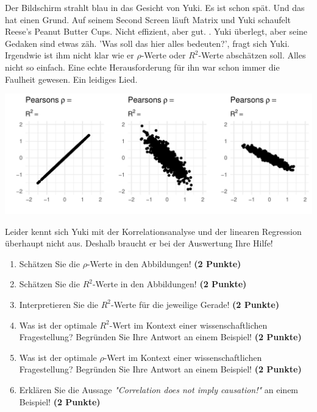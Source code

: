 \documentclass[a4paper, 9pt]{scrartcl}\usepackage[]{graphicx}\usepackage[]{xcolor}
\makeatletter
\def\maxwidth{ %
  \ifdim\Gin@nat@width>\linewidth
    \linewidth
  \else
    \Gin@nat@width
  \fi
}
\makeatother
\begin{document}
Der Bildschirm strahlt blau in das Gesicht von Yuki. Es ist schon spät. Und das hat einen Grund. Auf seinem Second Screen läuft Matrix und Yuki schaufelt Reese's Peanut Butter Cups. Nicht effizient, aber gut. . Yuki überlegt, aber seine Gedaken sind etwas zäh. 'Was soll das hier alles bedeuten?', fragt sich Yuki. Irgendwie ist ihm nicht klar wie er $\rho$-Werte oder $R^2$-Werte abschätzen soll. Alles nicht so einfach. Eine echte Herausforderung für ihn war schon immer die Faulheit gewesen. Ein leidiges Lied. 
\vspace{2Ex}



{\centering \includegraphics[width=\maxwidth]{img/correlation-02-1} 

}




Leider kennt sich Yuki mit der Korrelationsanalyse und der linearen Regression überhaupt nicht aus. Deshalb braucht er bei der Auswertung Ihre Hilfe!

\begin{enumerate}
\item Schätzen Sie die $\rho$-Werte in den Abbildungen! \textbf{(2 Punkte)}
\item Schätzen Sie die $R^2$-Werte in den Abbildungen! \textbf{(2 Punkte)}
\item Interpretieren Sie die $R^2$-Werte für die jeweilige Gerade! \textbf{(2 Punkte)}
\item Was ist der optimale $R^2$-Wert im Kontext einer wissenschaftlichen Fragestellung? Begründen Sie Ihre Antwort an einem Beispiel! \textbf{(2 Punkte)}
\item Was ist der optimale $\rho$-Wert im Kontext einer wissenschaftlichen Fragestellung? Begründen Sie Ihre Antwort an einem Beispiel! \textbf{(2 Punkte)}
\item Erklären Sie die Aussage \textit{"Correlation does not imply causation!"} an einem Beispiel! \textbf{(2 Punkte)}
\end{enumerate} 
\clearpage
\end{document}
